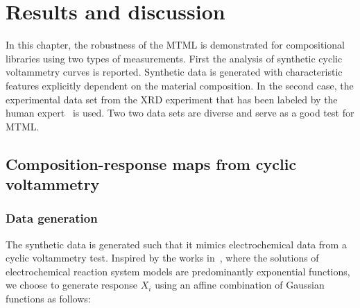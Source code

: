 \section{Results and discussion}
In this chapter, the robustness of the MTML is demonstrated for compositional libraries using two types of measurements. 
First the analysis of synthetic cyclic voltammetry curves is reported.
Synthetic data is generated with characteristic features explicitly dependent on the material composition. 
In the second case, the experimental data set from the XRD experiment that has been labeled by the human expert~\cite{long2007rapid} is used. 
Two two data sets are diverse and serve as a good test for MTML.

\subsection{Composition-response maps from cyclic voltammetry}

\subsubsection{Data generation}
The synthetic data is generated such that it mimics electrochemical data from a cyclic voltammetry test. 
Inspired by the works in~\cite{saveant1980catalysis,costentin2017catalysis}, where the solutions of electrochemical reaction system models are predominantly exponential functions, we choose to generate response $X_i$ using an affine combination of Gaussian functions as follows:


